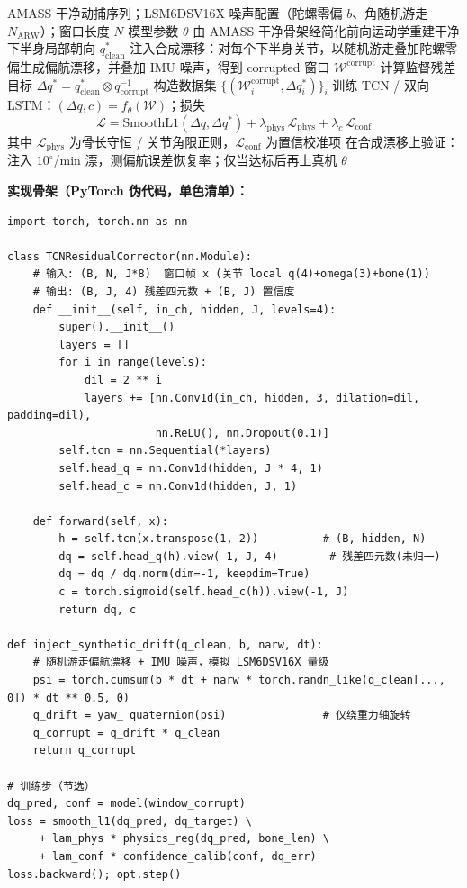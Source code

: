 \documentclass[UTF8,11pt,a4paper]{ctexart}
\begin{document}
\begin{algorithm}[H]
\caption{NN 残差校正器训练流程（离线、全合成）}
\label{alg:train}
\begin{algorithmic}[1]
\REQUIRE AMASS 干净动捕序列；LSM6DSV16X 噪声配置（陀螺零偏 $b$、角随机游走 $N_{\text{ARW}}$）；窗口长度 $N$
\ENSURE 模型参数 $\theta$
\STATE 由 AMASS 干净骨架经简化前向运动学重建干净下半身局部朝向 $q^{*}_{\text{clean}}$
\STATE 注入合成漂移：对每个下半身关节，以随机游走叠加陀螺零偏生成偏航漂移，并叠加 IMU 噪声，得到 corrupted 窗口 $\mathcal{W}^{\text{corrupt}}$
\STATE 计算监督残差目标 $\Delta q^{*} = q^{*}_{\text{clean}} \otimes q^{-1}_{\text{corrupt}}$
\STATE 构造数据集 $\{(\mathcal{W}^{\text{corrupt}}_i, \Delta q^{*}_i)\}_{i}$
\STATE 训练 TCN / 双向 LSTM：$(\Delta q, c) = f_{\theta}(\mathcal{W})$；损失
\[
\mathcal{L} = \text{SmoothL1}(\Delta q, \Delta q^{*}) + \lambda_{\text{phys}}\,\mathcal{L}_{\text{phys}} + \lambda_{c}\,\mathcal{L}_{\text{conf}}
\]
其中 $\mathcal{L}_{\text{phys}}$ 为骨长守恒 / 关节角限正则，$\mathcal{L}_{\text{conf}}$ 为置信校准项
\STATE 在合成漂移上验证：注入 $10^{\circ}$/min 漂，测偏航误差恢复率；仅当达标后再上真机
\RETURN $\theta$
\end{algorithmic}
\end{algorithm}

\noindent\textbf{实现骨架（PyTorch 伪代码，单色清单）：}

\begin{lstlisting}[caption={TCN 残差校正器与合成漂移注入（实现骨架）}, label={lst:skeleton}]
import torch, torch.nn as nn

class TCNResidualCorrector(nn.Module):
    # 输入: (B, N, J*8)  窗口帧 x (关节 local q(4)+omega(3)+bone(1))
    # 输出: (B, J, 4) 残差四元数 + (B, J) 置信度
    def __init__(self, in_ch, hidden, J, levels=4):
        super().__init__()
        layers = []
        for i in range(levels):
            dil = 2 ** i
            layers += [nn.Conv1d(in_ch, hidden, 3, dilation=dil, padding=dil),
                       nn.ReLU(), nn.Dropout(0.1)]
        self.tcn = nn.Sequential(*layers)
        self.head_q = nn.Conv1d(hidden, J * 4, 1)
        self.head_c = nn.Conv1d(hidden, J, 1)

    def forward(self, x):
        h = self.tcn(x.transpose(1, 2))          # (B, hidden, N)
        dq = self.head_q(h).view(-1, J, 4)        # 残差四元数(未归一)
        dq = dq / dq.norm(dim=-1, keepdim=True)
        c = torch.sigmoid(self.head_c(h)).view(-1, J)
        return dq, c

def inject_synthetic_drift(q_clean, b, narw, dt):
    # 随机游走偏航漂移 + IMU 噪声，模拟 LSM6DSV16X 量级
    psi = torch.cumsum(b * dt + narw * torch.randn_like(q_clean[..., 0]) * dt ** 0.5, 0)
    q_drift = yaw_ quaternion(psi)               # 仅绕重力轴旋转
    q_corrupt = q_drift * q_clean
    return q_corrupt

# 训练步（节选）
dq_pred, conf = model(window_corrupt)
loss = smooth_l1(dq_pred, dq_target) \
     + lam_phys * physics_reg(dq_pred, bone_len) \
     + lam_conf * confidence_calib(conf, dq_err)
loss.backward(); opt.step()
\end{lstlisting}
\end{document}
